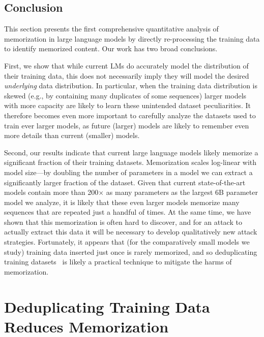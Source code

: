 \subsection{Conclusion}

%
This section presents the first comprehensive quantitative analysis of memorization in
large language models by directly re-processing the training data to identify memorized content.
%
Our work has two broad conclusions.

First, we show that while current LMs do accurately model the distribution of their training data, this does not necessarily imply they will model the desired \emph{underlying} data distribution.
In particular, when the training data distribution is skewed (e.g., by containing many duplicates of some sequences) larger models with more capacity are likely to learn these unintended dataset peculiarities.
%
It therefore becomes even more important to carefully analyze the datasets used to train ever larger models, as future (larger) models are likely to remember even more details than current (smaller) models.


Second, our results indicate that current large language models likely memorize a significant fraction of their training datasets.
%
Memorization scales log-linear with model size---by doubling the number of parameters in a model we can extract a significantly larger fraction of the dataset.
%
Given that current state-of-the-art models contain more than 200$\times$ as many parameters as the largest 6B parameter model we analyze, it is likely that these even larger models memorize many sequences that are repeated just a handful of times.
%
At the same time, we have shown that this memorization is often hard to discover, and for an attack to actually extract this data it will be necessary to develop qualitatively new attack strategies.
%
Fortunately, it appears that (for the comparatively small models we study) training data inserted just once is rarely memorized, and so deduplicating training datasets~\citep{lee2021deduplicating} is likely a practical technique to mitigate the harms of memorization.


\section{Deduplicating Training Data Reduces Memorization}

